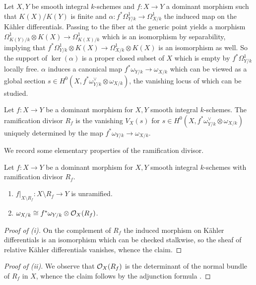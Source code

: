 Let $X,Y$ be smooth integral $k$-schemes and $f:X\to Y$ a dominant morphism such that $K(X)/K(Y)$ is finite and $\alpha:f^{*}\Omega^{1}_{Y/k}\to\Omega^{1}_{X/k}$ the induced map on the K\"{a}hler differentials. Passing to the fiber at the generic point yields a morphism $\Omega^{1}_{K(Y)/k}\otimes K(X)\to\Omega^{1}_{K(X)/k}$ which is an isomorphism by separability, implying that $f^{*}\Omega^{1}_{Y/k}\otimes K(X)\to\Omega^{1}_{X/k}\otimes K(X)$ is an isomorphism as well. So the support of $\ker(\alpha)$ is a proper closed subset of $X$ which is empty by $f^{*}\Omega^{1}_{Y/k}$ locally free. $\alpha$ induces a canonical map $f^{*}\omega_{Y/k}\to\omega_{X/k}$ which can be viewed as a global section $s\in H^{0}(X,f^{*}\omega_{Y/k}^{\vee}\otimes\omega_{X/k})$, the vanishing locus of which can be studied. 
\begin{definition}\label{def: ramification divisor}
    Let $f:X\to Y$ be a dominant morphism for $X,Y$ smooth integral $k$-schemes. The ramification divisor $R_{f}$ is the vanishing $V_{X}(s)$ for $s\in H^{0}(X,f^{*}\omega_{Y/k}^{\vee}\otimes\omega_{X/k})$ uniquely determined by the map $f^{*}\omega_{Y/k}\to\omega_{X/k}$. 
\end{definition}
We record some elementary properties of the ramification divisor. 
\begin{lemma}\label{lem: properties of ramification divisor}
    Let $f:X\to Y$ be a dominant morphism for $X,Y$ smooth integral $k$-schemes with ramification divisor $R_{f}$. 
    \begin{enumerate}[label=(\roman*)]
        \item $f|_{X\setminus R_{f}}:X\setminus R_{f}\to Y$ is unramified. 
        \item $\omega_{X/k}\cong f^{*}\omega_{Y/k}\otimes\mathcal{O}_{X}(R_{f})$. 
    \end{enumerate}
\end{lemma}
\begin{proof}[Proof of (i)]
    On the complement of $R_{f}$ the induced morphism on K\"{a}hler differentials is an isomorphism which can be checked stalkwise, so the sheaf of relative K\"{a}hler differentials vanishes, whence the claim. 
\end{proof}
\begin{proof}[Proof of (ii)]
    We observe that $\mathcal{O}_{X}(R_{f})$ is the determinant of the normal bundle of $R_{f}$ in $X$, whence the claim follows by the adjunction formula . 
\end{proof}
